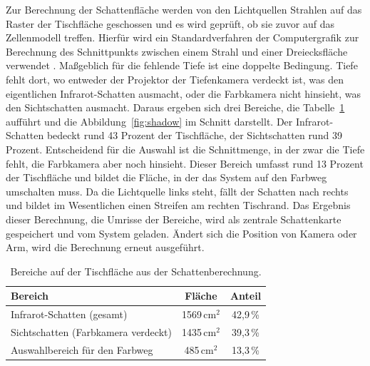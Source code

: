 \documentclass[oneside,studentpaper]{wbk}
\begin{document}
Zur Berechnung der Schattenfläche werden von den Lichtquellen Strahlen auf das
Raster der Tischfläche geschossen und es wird geprüft, ob sie zuvor auf das
Zellenmodell treffen. Hierfür wird ein Standardverfahren der Computergrafik zur
Berechnung des Schnittpunkts zwischen einem Strahl und einer Dreiecksfläche
verwendet \cite{mollertrumbore1997}. Maßgeblich für die fehlende Tiefe ist eine
doppelte Bedingung. Tiefe fehlt dort, wo entweder der Projektor der Tiefenkamera
verdeckt ist, was den eigentlichen Infrarot-Schatten ausmacht, oder die Farbkamera
nicht hinsieht, was den Sichtschatten ausmacht. Daraus ergeben sich drei
Bereiche, die Tabelle~\ref{tab:zonen} aufführt und die Abbildung~\ref{fig:shadow}
im Schnitt darstellt. Der Infrarot-Schatten bedeckt rund 43 Prozent der
Tischfläche, der Sichtschatten rund 39 Prozent. Entscheidend für die Auswahl ist
die Schnittmenge, in der zwar die Tiefe fehlt, die Farbkamera aber noch hinsieht.
Dieser Bereich umfasst rund 13 Prozent der Tischfläche und bildet die Fläche, in
der das System auf den Farbweg umschalten muss. Da die Lichtquelle links steht,
fällt der Schatten nach rechts und bildet im Wesentlichen einen Streifen am
rechten Tischrand. Das Ergebnis dieser Berechnung, die Umrisse der Bereiche, wird
als zentrale Schattenkarte gespeichert und vom System geladen. Ändert sich die
Position von Kamera oder Arm, wird die Berechnung erneut ausgeführt.

\begin{table}[H]
\caption{Bereiche auf der Tischfläche aus der Schattenberechnung.}
\label{tab:zonen}
\centering
\small
\begin{tabular}{l c c}
\toprule
\textbf{Bereich} & \textbf{Fläche} & \textbf{Anteil} \\
\midrule
Infrarot-Schatten (gesamt)        & 1569\,$\text{cm}^2$ & 42,9\,\% \\
Sichtschatten (Farbkamera verdeckt) & 1435\,$\text{cm}^2$ & 39,3\,\% \\
Auswahlbereich für den Farbweg     & 485\,$\text{cm}^2$  & 13,3\,\% \\
\bottomrule
\end{tabular}
\end{table}
\end{document}
